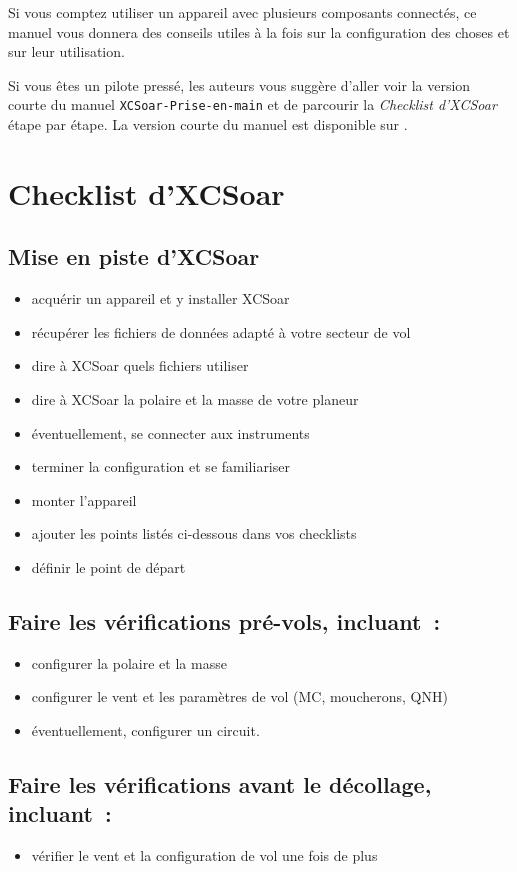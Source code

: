 Si vous comptez utiliser un appareil avec plusieurs composants connectés,
ce manuel vous donnera des conseils utiles à la fois sur la configuration des choses et sur
leur utilisation.

Si vous êtes un pilote pressé, les auteurs vous suggère d'aller voir la version courte
du manuel \texttt{XCSoar-Prise-en-main} et de parcourir la \emph{Checklist d'XCSoar}
étape par étape. La version courte du manuel est disponible sur .

\section{Checklist d'XCSoar}

\subsection*{{Mise en piste d'XCSoar}}
\begin{itemize}
\item acquérir un appareil et y installer XCSoar
\item récupérer les fichiers de données adapté à votre secteur de vol
\item dire à XCSoar quels fichiers utiliser
\item dire à XCSoar la polaire et la masse de votre planeur
\item éventuellement, se connecter aux instruments
\item terminer la configuration et se familiariser
\item monter l'appareil
\item ajouter les points listés ci-dessous dans vos checklists
\item définir le point de départ
\end{itemize}

\subsection*{Faire les vérifications pré-vols, incluant~:}
\begin{itemize}
\item configurer la polaire et la masse
\item configurer le vent et les paramètres de vol (MC, moucherons, QNH)
\item éventuellement, configurer un circuit.
\end{itemize}

\subsection*{Faire les vérifications avant le décollage, incluant~:}
\begin{itemize}
\item vérifier le vent et la configuration de vol une fois de plus
\end{itemize}
\vspace{2em}

